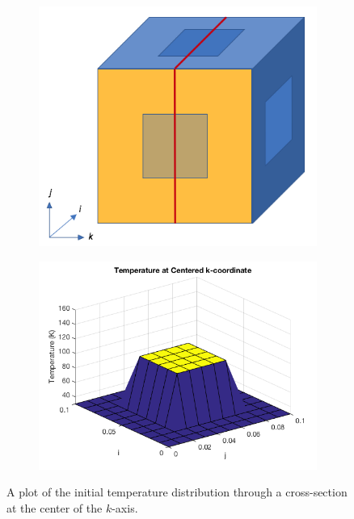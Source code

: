 \documentclass[12pt]{article}
\begin{document}
\begin{figure}[h!]
\begin{center}
\begin{subfigure}{0.3\textwidth}
\includegraphics[width=\linewidth]{../pics/centeredkpic.png}
\caption{\label{centeredjpic}}
\end{subfigure}
\begin{subfigure}{0.6\textwidth}
\includegraphics[width=\linewidth]{../pics/initialconditionscenteredk.png}
\caption{\label{centeredj}}
\end{subfigure}
\caption{\label{initial}A plot of the initial temperature distribution through a cross-section at the center of the $k$-axis.}
\end{center}
\end{figure}
\end{document}
